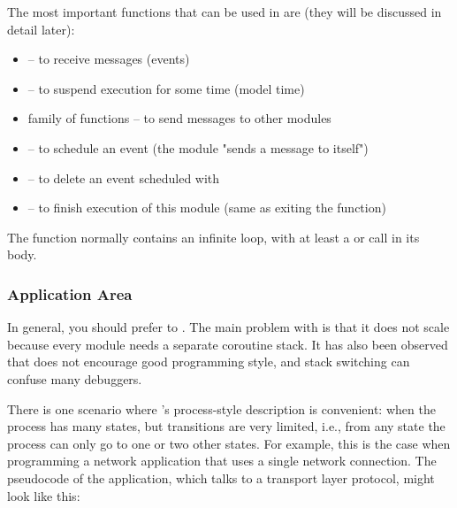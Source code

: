 The most important functions that can be used in  are
(they will be discussed in detail later):
\begin{itemize}
\item {} -- to receive messages (events)
\item {} -- to suspend execution
    for some time (model time)
\item {} family of functions -- to send messages to other
    modules
\item {} -- to schedule an event (the module "sends
    a message to itself")
\item {} -- to delete an event scheduled with
\item {} -- to finish execution of this module (same as
    exiting the  function)
\end{itemize}

The  function normally contains an infinite loop,
with at least a  or  call in its body.



\subsubsection{Application Area}
\label{sec:simple-modules:activity:application-area}

In general, you should prefer  to .
The main problem with  is that it does not scale because
every module needs a separate coroutine stack. It has also been observed
that  does not encourage good programming style, and
stack switching can confuse many debuggers.

There is one scenario where 's process-style
description is convenient: when the process has many
states, but transitions are very limited, i.e., from any state the
process can only go to one or two other states.  For example, this is
the case when programming a network application that uses a single
network connection.  The pseudocode of the application, which talks to
a transport layer protocol, might look like this:

